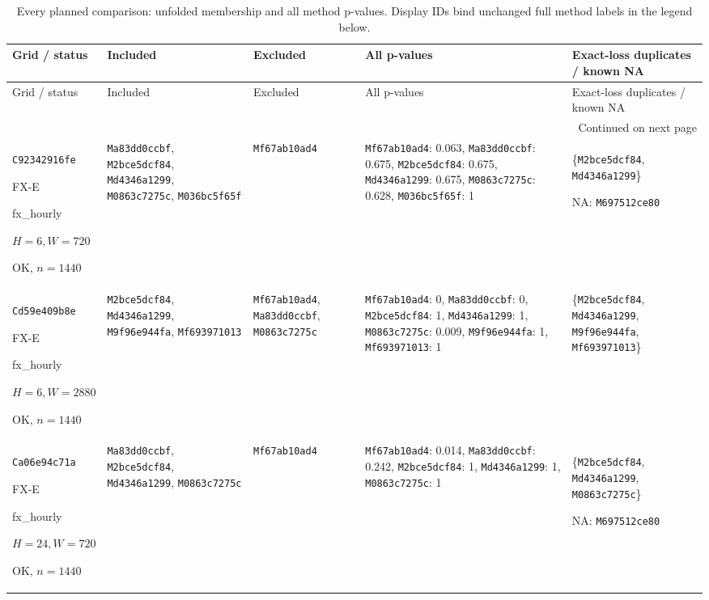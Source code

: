 \begingroup
\scriptsize
\setlength{\tabcolsep}{3pt}
\begin{longtable}{p{.15\linewidth}p{.17\linewidth}p{.17\linewidth}p{.25\linewidth}p{.14\linewidth}}
\caption{Every planned comparison: unfolded membership and all method p-values. Display IDs bind unchanged full method labels in the legend below.}\label{tab:v10-mcs-full}\\
\toprule
Grid / status & Included & Excluded & All p-values & Exact-loss duplicates / known NA \\
\midrule
\endfirsthead
\toprule
Grid / status & Included & Excluded & All p-values & Exact-loss duplicates / known NA \\
\midrule
\endhead
\midrule\multicolumn{5}{r}{Continued on next page}\\\endfoot
\bottomrule\endlastfoot
\texttt{C92342916fe}\par FX-E\par fx\_\allowbreak{}hourly\par $H=6,W=720$\par OK, $n=1440$ & \texttt{Ma83dd0ccbf}, \texttt{M2bce5dcf84}, \texttt{Md4346a1299}, \texttt{M0863c7275c}, \texttt{M036bc5f65f} & \texttt{Mf67ab10ad4} & \texttt{Mf67ab10ad4}: 0.063, \texttt{Ma83dd0ccbf}: 0.675, \texttt{M2bce5dcf84}: 0.675, \texttt{Md4346a1299}: 0.675, \texttt{M0863c7275c}: 0.628, \texttt{M036bc5f65f}: 1 & \{\texttt{M2bce5dcf84}, \texttt{Md4346a1299}\}\par NA: \texttt{M697512ce80} \\
\texttt{Cd59e409b8e}\par FX-E\par fx\_\allowbreak{}hourly\par $H=6,W=2880$\par OK, $n=1440$ & \texttt{M2bce5dcf84}, \texttt{Md4346a1299}, \texttt{M9f96e944fa}, \texttt{Mf693971013} & \texttt{Mf67ab10ad4}, \texttt{Ma83dd0ccbf}, \texttt{M0863c7275c} & \texttt{Mf67ab10ad4}: 0, \texttt{Ma83dd0ccbf}: 0, \texttt{M2bce5dcf84}: 1, \texttt{Md4346a1299}: 1, \texttt{M0863c7275c}: 0.009, \texttt{M9f96e944fa}: 1, \texttt{Mf693971013}: 1 & \{\texttt{M2bce5dcf84}, \texttt{Md4346a1299}, \texttt{M9f96e944fa}, \texttt{Mf693971013}\} \\
\texttt{Ca06e94c71a}\par FX-E\par fx\_\allowbreak{}hourly\par $H=24,W=720$\par OK, $n=1440$ & \texttt{Ma83dd0ccbf}, \texttt{M2bce5dcf84}, \texttt{Md4346a1299}, \texttt{M0863c7275c} & \texttt{Mf67ab10ad4} & \texttt{Mf67ab10ad4}: 0.014, \texttt{Ma83dd0ccbf}: 0.242, \texttt{M2bce5dcf84}: 1, \texttt{Md4346a1299}: 1, \texttt{M0863c7275c}: 1 & \{\texttt{M2bce5dcf84}, \texttt{Md4346a1299}, \texttt{M0863c7275c}\}\par NA: \texttt{M697512ce80} \\

\end{longtable}
